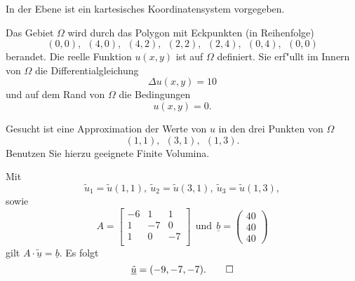 In der Ebene ist ein kartesisches Koordinatensystem vorgegeben. 

\vspace{2mm}

Das Gebiet $\Omega$ wird durch das Polygon mit Eckpunkten (in Reihenfolge)
\[
(0,0), \ \ (4,0), \ \ (4,2), \ \ (2,2),  \ \ (2,4),  \ \ (0,4), \ \  (0,0)
\]
berandet.
Die reelle Funktion $u(x,y)$ ist auf $\Omega$ definiert.
Sie erf"ullt im Innern von $\Omega$ die Differentialgleichung
\[
\Delta u(x,y) = 10
\]
und auf dem Rand von $\Omega$ die Bedingungen
\[
u(x,y) = 0.
\]

\vspace{1mm}

Gesucht ist eine Approximation der Werte von $u$ in den drei Punkten
von $\Omega$
\[
(1,1), \ \  (3,1), \ \ (1,3).
\]
Benutzen Sie hierzu geeignete Finite Volumina.  

\begin{loesung}
Mit 
\[
\tilde u_1 = \tilde u(1,1), \ \tilde u_2 = \tilde u(3,1), \ \tilde u_3 = \tilde u(1,3),
\]
sowie 
\[
A = \left[\begin{array}{rrr} 
- 6 & 1 & 1 \\
1 & -7 & 0 \\
1 & 0 & -7 \\
 \end{array}\right] \ \ \mbox{und} \ \
\underline{b} =  \left(\begin{array}{r} 40 \\ 40 \\ 40  \end{array}\right)
\]
gilt $A \cdot \underline{\tilde u} = \underline{b}.$ 
Es folgt 
\[
\underline{\tilde u} = (-9, -7, -7).
\qedhere
\]
\end{loesung}



